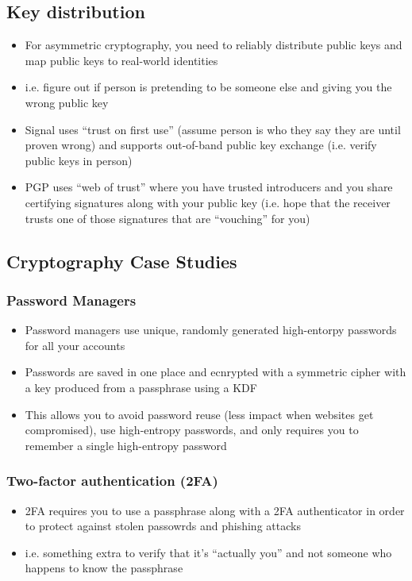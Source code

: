 \documentclass[letterpaper,12pt]{article}
\begin{document}
\subsection{Key distribution}
\begin{itemize}
 \item For asymmetric cryptography, you need to reliably distribute public keys and map public keys to real-world identities
 \item i.e. figure out if person is pretending to be someone else and giving you the wrong public key
 \item Signal uses ``trust on first use'' (assume person is who they say they are until proven wrong) and supports out-of-band public key exchange (i.e. verify public keys in person)
 \item PGP uses ``web of trust'' where you have trusted introducers and you share certifying signatures along with your public key (i.e. hope that the receiver trusts one of those signatures that are ``vouching'' for you)
\end{itemize}

\subsection{Cryptography Case Studies}

\subsubsection{Password Managers}
\begin{itemize}
 \item Password managers use unique, randomly generated high-entorpy passwords for all your accounts
 \item Passwords are saved in one place and ecnrypted with a symmetric cipher with a key produced from a passphrase using a KDF
 \item This allows you to avoid password reuse (less impact when websites get compromised), use high-entropy passwords, and only requires you to remember a single high-entropy password
\end{itemize}

\subsubsection{Two-factor authentication (2FA)}
\begin{itemize}
 \item 2FA requires you to use a passphrase along with a 2FA authenticator in order to protect against stolen passowrds and phishing attacks
 \item i.e. something extra to verify that it's ``actually you'' and not someone who happens to know the passphrase
\end{itemize}
\end{document}
